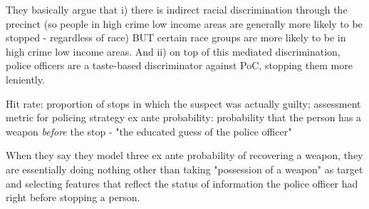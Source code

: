 They basically argue that i) there is indirect racial discrimination through the precinct (so people in high crime low income areas are generally more likely to be stopped - regardless of race) BUT certain race groups are more likely to be in high crime low income areas.
And ii) on top of this mediated discrimination, police officers are a taste-based discriminator against PoC, stopping them more leniently.

Hit rate: proportion of stops in which the suspect was actually guilty; assessment metric for policing strategy
ex ante probability: probability that the person has a weapon \textit{before} the stop - "the educated guess of the police officer"


When they say they model three ex ante probability of recovering a weapon, they are essentially doing nothing other than taking "possession of a weapon" as target and selecting features that reflect the status of information the police officer had right before stopping a person.